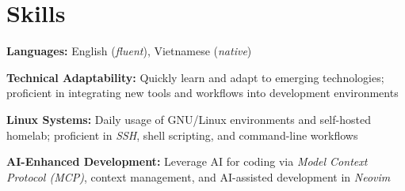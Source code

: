 \section{Skills}

\begin{onecolentry}
	\textbf{Languages:}
	English (\textit{fluent}),
	Vietnamese (\textit{native})
\end{onecolentry}

\vspace{0.2cm}

\begin{onecolentry}
	\textbf{Technical Adaptability:}
	Quickly learn and adapt to emerging technologies; proficient in integrating new tools and workflows into
	development environments
\end{onecolentry}

\vspace{0.2cm}

\begin{onecolentry}
	\textbf{Linux Systems:}
	Daily usage of GNU/Linux environments and self-hosted homelab; proficient in \textit{SSH}, shell scripting,
	and command-line workflows
\end{onecolentry}

\vspace{0.2cm}

\begin{onecolentry}
	\textbf{AI-Enhanced Development:}
	Leverage AI for coding via \textit{Model Context Protocol (MCP)}, context management, and AI-assisted
	development in \textit{Neovim}
\end{onecolentry}
